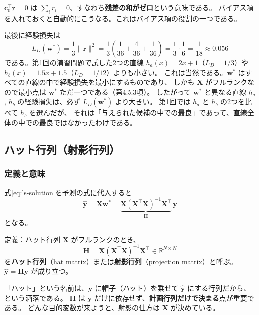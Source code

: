 $\bm{c}_0^\top\bm{r} = 0$ は $\sum_i r_i = 0$、すなわち\textbf{残差の和がゼロ}という意味である。
バイアス項を入れておくと自動的にこうなる。これはバイアス項の役割の一つである。

最後に経験損失は
\begin{equation*}
  L_D(\bm{w}^*) = \frac{1}{3}\|\bm{r}\|^2
   = \frac{1}{3}\left( \frac{1}{36} + \frac{4}{36} + \frac{1}{36} \right)
   = \frac{1}{3} \cdot \frac{1}{6} = \frac{1}{18} \approx 0.056
\end{equation*}
である。第1回の演習問題で試した2つの直線
$h_a(x) = 2x+1$（$L_D = 1/3$）や $h_b(x) = 1.5x + 1.5$（$L_D = 1/12$）よりも小さい。
これは当然である。$\bm{w}^*$ はすべての直線の中で経験損失を最小にするものであり、
しかも $\bm{X}$ がフルランクなので最小点は $\bm{w}^*$ ただ一つである（第4.5.3項）。
したがって $\bm{w}^*$ と異なる直線 $h_a$, $h_b$ の経験損失は、必ず $L_D(\bm{w}^*)$ より大きい。
第1回では $h_a$ と $h_b$ の2つを比べて $h_b$ を選んだが、
それは「与えられた候補の中での最良」であって、直線全体の中での最良ではなかったわけである。


\subsection{ハット行列（射影行列）}

\subsubsection{定義と意味}

式\eqref{eq:ls-solution}を予測の式に代入すると
\begin{equation}
  \hat{\bm{y}} = \bm{X}\bm{w}^* = \underbrace{\bm{X}(\bm{X}^\top\bm{X})^{-1}\bm{X}^\top}_{\bm{H}}\,\bm{y}
  \label{eq:hat}
\end{equation}
となる。

\begin{itembox}[l]{定義：ハット行列}
$\bm{X}$ がフルランクのとき、
\begin{equation}
  \bm{H} = \bm{X}(\bm{X}^\top\bm{X})^{-1}\bm{X}^\top \in \mathbb{R}^{N \times N}
\end{equation}
を\textbf{ハット行列}（hat matrix）または\textbf{射影行列}（projection matrix）と呼ぶ。
$\hat{\bm{y}} = \bm{H}\bm{y}$ が成り立つ。
\end{itembox}

「ハット」という名前は、$\bm{y}$ に帽子（ハット）を乗せて $\hat{\bm{y}}$ にする行列だから、という洒落である。
$\bm{H}$ は $\bm{y}$ だけに依存せず、\textbf{計画行列だけで決まる}点が重要である。
どんな目的変数が来ようと、射影の仕方は $\bm{X}$ が決めている。

